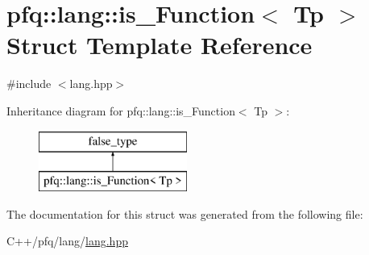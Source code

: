 \hypertarget{structpfq_1_1lang_1_1is__Function}{\section{pfq\+:\+:lang\+:\+:is\+\_\+\+Function$<$ Tp $>$ Struct Template Reference}
\label{structpfq_1_1lang_1_1is__Function}
}


{\ttfamily \#include $<$lang.\+hpp$>$}

Inheritance diagram for pfq\+:\+:lang\+:\+:is\+\_\+\+Function$<$ Tp $>$\+:\begin{figure}[H]
\begin{center}
\leavevmode
\includegraphics[height=2.000000cm]{structpfq_1_1lang_1_1is__Function}
\end{center}
\end{figure}


The documentation for this struct was generated from the following file\+:\begin{DoxyCompactItemize}
\item 
C++/pfq/lang/\hyperlink{lang_8hpp}{lang.\+hpp}\end{DoxyCompactItemize}
